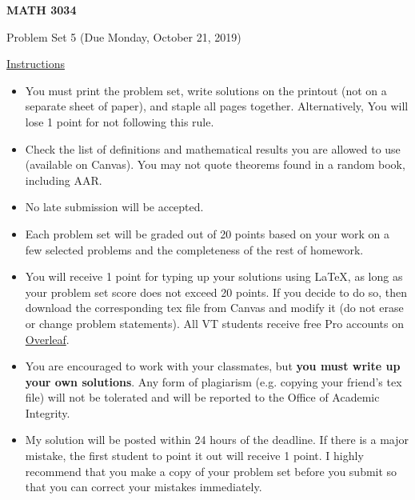 \documentclass[12pt]{amsart}
\begin{document}

\hfill{}

\vspace{0.3in}
\begin{center}
{\Large{\textbf{MATH 3034}}}

\vspace{0.1in}
{\large{Problem Set 5 (Due Monday, October 21, 2019)}}
\end{center}

\vspace{0.3in}
\noindent
\underline{Instructions}
\begin{itemize}
\vspace{0.1in}
\item You must print the problem set, write solutions on the printout (not on a separate sheet of paper), and staple all pages together.  Alternatively,  You will lose 1 point for not following this rule.
\vspace{0.1in}
\item Check the list of definitions and mathematical results you are allowed to use (available on Canvas).  You may not quote theorems found in a random book, including AAR.
\vspace{0.1in}
\item No late submission will be accepted.
\vspace{0.1in}
\item Each problem set will be graded out of 20 points based on your work on a few selected problems and the completeness of the rest of homework.
\vspace{0.1in}
\item You will receive 1 point for typing up your solutions using \LaTeX, as long as your problem set score does not exceed 20 points.  If you decide to do so, then download the corresponding tex file from Canvas and modify it (do not erase or change problem statements).  All VT students receive free Pro accounts on \href{https://www.overleaf.com/edu/vtech}{Overleaf}.
\vspace{0.1in}
\item You are encouraged to work with your classmates, but \textbf{you must write up your own solutions}.  Any form of plagiarism (e.g. copying your friend's tex file) will not be tolerated and will be reported to the Office of Academic Integrity.
\vspace{0.1in}
\item My solution will be posted within 24 hours of the deadline.  If there is a major mistake, the first student to point it out will receive 1 point.  I highly recommend that you make a copy of your problem set before you submit so that you can correct your mistakes immediately.
\end{itemize}
\end{document}

